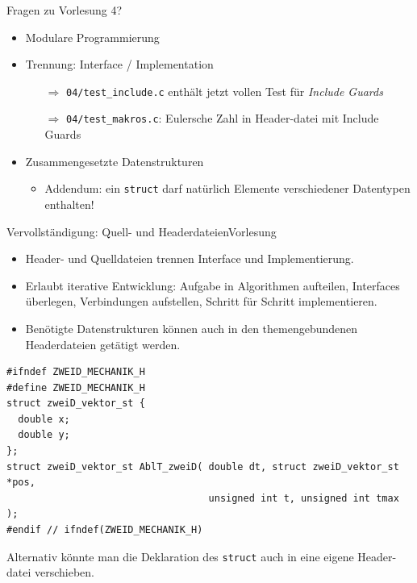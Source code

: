 \documentclass[xcolor=dvipsnames]{beamer}
\newcounter{lecturecounter}
\begin{document}
\begin{frame}[fragile]{Fragen zu Vorlesung 4?}
  \begin{itemize}
    \item{Modulare Programmierung}
    \item{Trennung: Interface / Implementation }
    \begin{itemize}
      \item[$\Rightarrow$]{\verb|04/test_include.c| enthält jetzt vollen Test für \emph{Include Guards}}
      \item[$\Rightarrow$]{\verb|04/test_makros.c|: Eulersche Zahl in Header-datei mit Include Guards}
    \end{itemize}
    \vspace{0.3cm}
    \item{Zusammengesetzte Datenstrukturen}
    \begin{itemize}
      \item{Addendum: ein \texttt{struct} darf natürlich Elemente verschiedener Datentypen enthalten!}
    \end{itemize}
  \end{itemize}
\end{frame}

\begin{frame}[fragile]{Vervollständigung: Quell- und Headerdateien}{Vorlesung }
  \begin{block}{}
    \small
    \begin{itemize}
      \item{Header- und Quelldateien trennen Interface und Implementierung.}
      \item{Erlaubt iterative Entwicklung: Aufgabe in Algorithmen aufteilen, Interfaces überlegen, Verbindungen aufstellen, Schritt für Schritt implementieren.}
      \item{Benötigte Datenstrukturen können auch in den themengebundenen Headerdateien getätigt werden.}
    \end{itemize}
  \end{block}
\begin{lstlisting}[basicstyle=\ttfamily\scriptsize]
#ifndef ZWEID_MECHANIK_H
#define ZWEID_MECHANIK_H
struct zweiD_vektor_st {
  double x;
  double y;
};
struct zweiD_vektor_st AblT_zweiD( double dt, struct zweiD_vektor_st *pos,
                                   unsigned int t, unsigned int tmax );
#endif // ifndef(ZWEID_MECHANIK_H)
\end{lstlisting}
\vspace{-0.2cm}
\begin{block}{}
  Alternativ könnte man die Deklaration des \verb|struct| auch in eine eigene Header-datei verschieben.
\end{block}
\end{frame}
\end{document}
